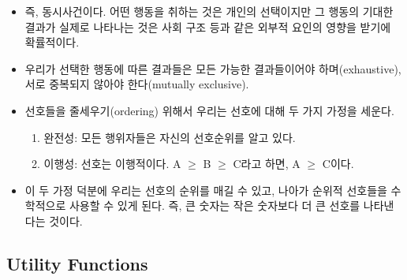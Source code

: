 \documentclass[]{book}
\providecommand{\tightlist}{%
  \setlength{\itemsep}{0pt}\setlength{\parskip}{0pt}}
\begin{document}
\begin{itemize}
\item
  즉, 동시사건이다. 어떤 행동을 취하는 것은 개인의 선택이지만 그 행동의 기대한 결과가 실제로 나타나는 것은 사회 구조 등과 같은 외부적 요인의 영향을 받기에 확률적이다.
\item
  우리가 선택한 행동에 따른 결과들은 모든 가능한 결과들이어야 하며(exhaustive), 서로 중복되지 않아야 한다(mutually exclusive).
\item
  선호들을 줄세우기(ordering) 위해서 우리는 선호에 대해 두 가지 가정을 세운다.

  \begin{enumerate}
  \def\labelenumi{\arabic{enumi}.}
  \tightlist
  \item
    완전성: 모든 행위자들은 자신의 선호순위를 알고 있다.
  \item
    이행성: 선호는 이행적이다. A \(\geq\) B \(\geq\) C라고 하면, A \(\geq\) C이다.
  \end{enumerate}
\item
  이 두 가정 덕분에 우리는 선호의 순위를 매길 수 있고, 나아가 순위적 선호들을 수학적으로 사용할 수 있게 된다. 즉, 큰 숫자는 작은 숫자보다 더 큰 선호를 나타낸다는 것이다.
\end{itemize}

\hypertarget{utility-functions}{%
\subsection{Utility Functions}\label{utility-functions}}
\end{document}
